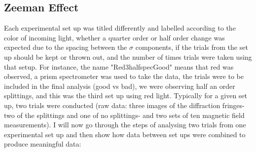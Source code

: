 \documentclass{article}
\begin{document}
    \subsection{Zeeman Effect}
    Each experimental set up was titled differently and labelled according to the color of incoming light, whether a quarter order or half order change was expected due to the spacing between the $\sigma$ components, if the trials from the set up should be kept or thrown out, and the number of times trials were taken using that setup. For instance, the name "Red3halfspecGood" means that red was observed, a prism spectrometer was used to take the data, the trials were to be included in the final analysis (good vs bad), we were observing half an order splittings, and this was the third set up using red light. Typically for a given set up, two trials were conducted (raw data: three images of the diffraction fringes- two of the splittings and one of no splittings- and two sets of ten magnetic field measurements). I will now go through the steps of analysing two trials from one experimental set up and then show how data between set ups were combined to produce meaningful data:
\end{document}

